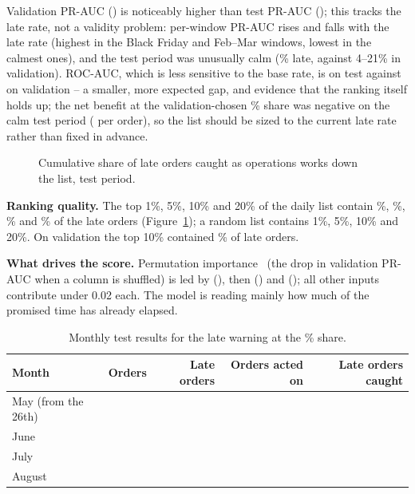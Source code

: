 \documentclass[12pt,a4paper]{article}
\begin{document}
Validation PR-AUC (\ValSelPR{}) is noticeably higher than test PR-AUC (\ClsTestPR{}); this tracks the late rate, not a validity problem: per-window PR-AUC rises and falls with the late rate (highest in the Black Friday and Feb--Mar windows, lowest in the calmest ones), and the test period was unusually calm (\ClsTestLate{}\% late, against 4--21\% in validation). ROC-AUC, which is less sensitive to the base rate, is \ClsTestROC{} on test against \ValSelROC{} on validation -- a smaller, more expected gap, and evidence that the ranking itself holds up; the net benefit at the validation-chosen \ActShare{}\% share was negative on the calm test period (\ClsNetBenefit{} per order), so the list should be sized to the current late rate rather than fixed in advance.

\begin{figure}[ht]
\centering

\caption{Cumulative share of late orders caught as operations works down the list, test period.}
\label{fig:gains}
\end{figure}

\textbf{Ranking quality.} The top 1\%, 5\%, 10\% and 20\% of the daily list contain \GainOneModel{}\%, \GainFiveModel{}\%, \GainTenModel{}\% and \GainTwentyModel{}\% of the late orders (Figure~\ref{fig:gains}); a random list contains 1\%, 5\%, 10\% and 20\%. On validation the top 10\% contained \ValSelRecallTen{}\% of late orders.

\textbf{What drives the score.} Permutation importance~\cite{breiman2001} (the drop in validation PR-AUC when a column is shuffled) is led by \texttt{\ImpAName{}} (\ImpADrop{}), then \texttt{\ImpBName{}} (\ImpBDrop{}) and \texttt{\ImpCName{}} (\ImpCDrop{}); all other inputs contribute under 0.02 each. The model is reading mainly how much of the promised time has already elapsed.

\begin{table}[ht]
\centering\small
\caption{Monthly test results for the late warning at the \ActShare{}\% share.}
\label{tab:classifier-monthly}
\begin{tabular}{@{}lrrrr@{}}
\toprule
Month & Orders & Late orders & Orders acted on & Late orders caught \\
\midrule
May (from the 26th) & \TestMayOrders{} & \TestMayLateCount{} & \TestMayActed{} & \TestMayCaught{} \\
June & \TestJunOrders{} & \TestJunLateCount{} & \TestJunActed{} & \TestJunCaught{} \\
July & \TestJulOrders{} & \TestJulLateCount{} & \TestJulActed{} & \TestJulCaught{} \\
August & \TestAugOrders{} & \TestAugLateCount{} & \TestAugActed{} & \TestAugCaught{} \\
\bottomrule
\end{tabular}
\end{table}
\end{document}
